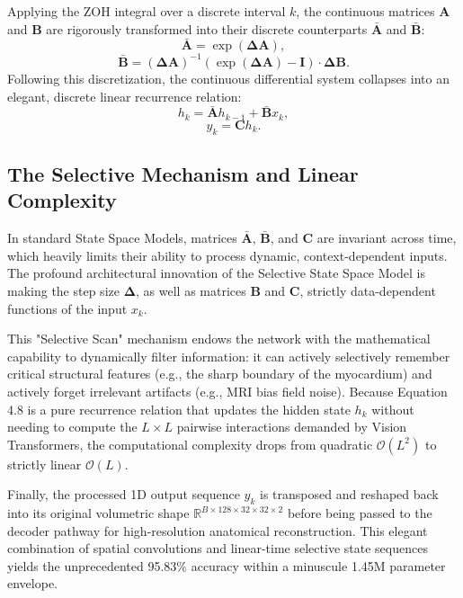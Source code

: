 Applying the ZOH integral over a discrete interval $k$, the continuous matrices $\mathbf{A}$ and $\mathbf{B}$ are rigorously transformed into their discrete counterparts $\mathbf{\bar{A}}$ and $\mathbf{\bar{B}}$:
\begin{equation}
    \mathbf{\bar{A}} = \exp(\mathbf{\Delta} \mathbf{A}),
\end{equation}
\begin{equation}
    \mathbf{\bar{B}} = (\mathbf{\Delta} \mathbf{A})^{-1} (\exp(\mathbf{\Delta} \mathbf{A}) - \mathbf{I}) \cdot \mathbf{\Delta} \mathbf{B}.
\end{equation}
Following this discretization, the continuous differential system collapses into an elegant, discrete linear recurrence relation:
\begin{equation}
    h_k = \mathbf{\bar{A}}h_{k-1} + \mathbf{\bar{B}}x_k,
\end{equation}
\begin{equation}
    y_k = \mathbf{C}h_k.
\end{equation}

\subsection{The Selective Mechanism and Linear Complexity}
In standard State Space Models, matrices $\mathbf{\bar{A}}$, $\mathbf{\bar{B}}$, and $\mathbf{C}$ are invariant across time, which heavily limits their ability to process dynamic, context-dependent inputs. The profound architectural innovation of the Selective State Space Model is making the step size $\mathbf{\Delta}$, as well as matrices $\mathbf{B}$ and $\mathbf{C}$, strictly data-dependent functions of the input $x_k$. 

This "Selective Scan" mechanism endows the network with the mathematical capability to dynamically filter information: it can actively selectively remember critical structural features (e.g., the sharp boundary of the myocardium) and actively forget irrelevant artifacts (e.g., MRI bias field noise). Because Equation 4.8 is a pure recurrence relation that updates the hidden state $h_k$ without needing to compute the $L \times L$ pairwise interactions demanded by Vision Transformers, the computational complexity drops from quadratic $\mathcal{O}(L^2)$ to strictly linear $\mathcal{O}(L)$. 

Finally, the processed 1D output sequence $y_k$ is transposed and reshaped back into its original volumetric shape $\mathbb{R}^{B \times 128 \times 32 \times 32 \times 2}$ before being passed to the decoder pathway for high-resolution anatomical reconstruction. This elegant combination of spatial convolutions and linear-time selective state sequences yields the unprecedented 95.83\% accuracy within a minuscule 1.45M parameter envelope.

